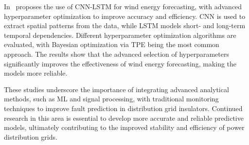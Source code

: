 In~\citep{hyperparameterTS2024} proposes the use of CNN-LSTM for wind energy forecasting, with advanced hyperparameter optimization to improve accuracy and efficiency. CNN is used to extract spatial patterns from the data, while LSTM models short- and long-term temporal dependencies. Different hyperparameter optimization algorithms are evaluated, %
with Bayesian optimization via TPE being the most common approach. The results show that the advanced selection of hyperparameters significantly improves the effectiveness of wind energy forecasting, making the models more %
reliable.

These studies underscore the importance of integrating advanced analytical methods, such as ML and signal processing, with traditional monitoring techniques to improve fault prediction in distribution grid insulators. Continued research in this area is essential to develop more accurate and reliable predictive models, ultimately contributing to the improved stability and efficiency of power distribution grids.